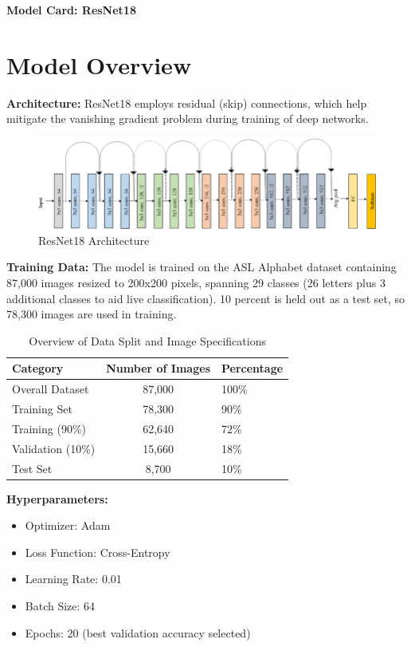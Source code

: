 \documentclass[12pt, a4paper]{article}
\begin{document}
\begin{center}
    \Large\textbf{Model Card: ResNet18}\\[0.3cm]
\end{center}

\section{Model Overview}
\textbf{Architecture:} ResNet18 employs residual (skip) connections, which help mitigate the vanishing gradient problem during training of deep networks.\\[0.3cm]
\begin{figure}[H]
    \centering
    \includegraphics[width=\textwidth]{../../plots/Original-ResNet-18-Architecture.png}
    \caption{ResNet18 Architecture  \cite{deep_learning_alzheimers}}
    \label{fig:resnet18_architecture}
\end{figure}
\textbf{Training Data:} The model is trained on the ASL Alphabet dataset containing 87,000 images resized to 200x200 pixels, spanning 29 classes (26 letters plus 3 additional classes to aid live classification). 10 percent is held out as a test set, so 78,300 images are used in training.
\begin{table}[H]
    \centering
    \caption{Overview of Data Split and Image Specifications}
    \label{tab:datasplit}
    \begin{tabular}{|l|cl|}
    \hline
    \textbf{Category} & \textbf{Number of Images} & \textbf{Percentage} \\
    \hline
    Overall Dataset & 87,000 & 100\% \\
    Training Set & 78,300 & 90\% \\
    \quad Training (90\%) & 62,640 & 72\% \\ 
    \quad Validation (10\%) & 15,660 & 18\% \\ 
    Test Set & 8,700 & 10\% \\
    \hline
    \end{tabular}
    \end{table}
\textbf{Hyperparameters:}
\begin{itemize}
    \item Optimizer: Adam
    \item Loss Function: Cross-Entropy
    \item Learning Rate: 0.01
    \item Batch Size: 64
    \item Epochs: 20 (best validation accuracy selected)
\end{itemize}
\end{document}
